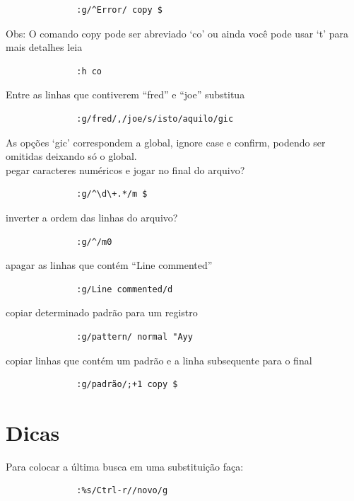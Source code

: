 \documentclass[10pt,a4paper,openany]{book}
\begin{document}
\begin{verbatim}
			  :g/^Error/ copy $
\end{verbatim}

Obs: O comando copy pode ser abreviado `co' ou ainda você pode usar `t'
para mais detalhes leia

\begin{verbatim}
			  :h co
\end{verbatim}

Entre as linhas que contiverem ``fred'' e ``joe'' substitua

\begin{verbatim}
			  :g/fred/,/joe/s/isto/aquilo/gic
\end{verbatim}

As opções `gic' correspondem a global, ignore case e confirm, podendo ser
omitidas deixando só o global. \\


pegar caracteres numéricos e jogar no final do arquivo?

\begin{verbatim}
			  :g/^\d\+.*/m $
\end{verbatim}

inverter a ordem das linhas do arquivo?

\begin{verbatim}
			  :g/^/m0
\end{verbatim}

apagar as linhas que contém ``Line commented''

\begin{verbatim}
			  :g/Line commented/d
\end{verbatim}

copiar determinado padrão para um registro

\begin{verbatim}
			  :g/pattern/ normal "Ayy
\end{verbatim}

copiar linhas que contém um padrão e a linha subsequente para o final

\begin{verbatim}
			  :g/padrão/;+1 copy $
\end{verbatim}

\section{Dicas }
Para colocar a última busca em uma substituição faça:

\begin{verbatim}
			  :%s/Ctrl-r//novo/g
\end{verbatim}
\end{document}
